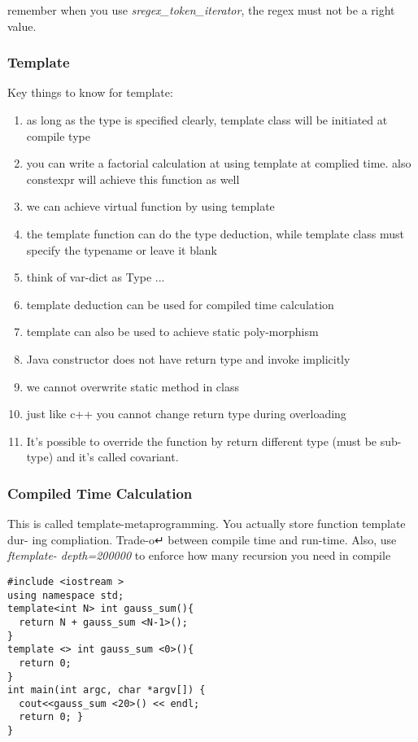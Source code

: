 remember when you use \textit{sregex\_token\_iterator}, the {\color{blue}regex must not be a right value}.


\subsubsection{Template}

Key things to know for template:
\begin{enumerate}
\item as long as the type is specified clearly, template class will be initiated at compile type
\item you can write a factorial calculation at using template at complied time. also {\color{blue}constexpr} will achieve this function as well
\item we can achieve virtual function by using template
\item the template function can do the type deduction, while template class must specify the typename or leave it blank
\item think of var-dict as Type ...
\item template deduction can be used for compiled time calculation
\item template can also be used to achieve static poly-morphism
\item Java constructor does not have return type and invoke implicitly
\item we cannot overwrite static method in class
\item just like c++ you cannot change return type during overloading
\item It's possible to override the function by return different type (must be sub-type) and it's called {\color{red}covariant}.
\end{enumerate}

\subsubsection{Compiled Time Calculation}
This is called template-metaprogramming. You actually store function template dur- ing compliation. Trade-o↵ between compile time and run-time. Also, use \textit{ftemplate- depth=200000} to enforce how many recursion you need in compile

\begin{lstlisting}
#include <iostream >
using namespace std;
template<int N> int gauss_sum(){
  return N + gauss_sum <N-1>();
}
template <> int gauss_sum <0>(){
  return 0;
}
int main(int argc, char *argv[]) {
  cout<<gauss_sum <20>() << endl;
  return 0; }
}
\end{lstlisting}

